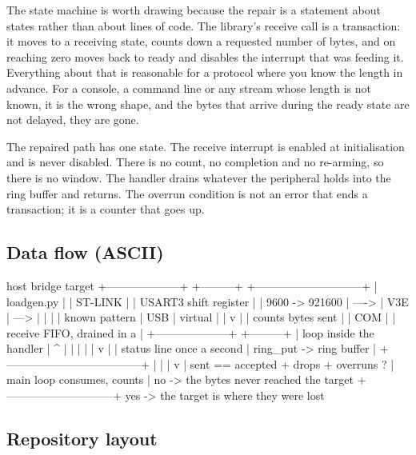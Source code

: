 The state machine is worth drawing because the repair is a statement about
states rather than about lines of code. The library's receive call is a
transaction: it moves to a receiving state, counts down a requested number of
bytes, and on reaching zero moves back to ready and disables the interrupt that
was feeding it. Everything about that is reasonable for a protocol where you
know the length in advance. For a console, a command line or any stream whose
length is not known, it is the wrong shape, and the bytes that arrive during the
ready state are not delayed, they are gone.

The repaired path has one state. The receive interrupt is enabled at
initialisation and is never disabled. There is no count, no completion and no
re-arming, so there is no window. The handler drains whatever the peripheral
holds into the ring buffer and returns. The overrun condition is not an error
that ends a transaction; it is a counter that goes up.

\subsection*{Data flow (ASCII)}

\begin{asciiart}
  host                          bridge                target
  +--------------------+       +---------+      +-----------------------------+
  | loadgen.py         |       | ST-LINK |      | USART3 shift register       |
  |  9600 -> 921600    | ----> | V3E     | ---> |   |                         |
  |  known pattern     |  USB  | virtual |      |   v                         |
  |  counts bytes sent |       | COM     |      | receive FIFO, drained in a  |
  +--------------------+       +---------+      | loop inside the handler     |
           ^                                    |   |                         |
           |                                    |   v                         |
           |   status line once a second        | ring_put -> ring buffer     |
           +------------------------------------+   |                         |
                                                |   v                         |
   sent == accepted + drops + overruns ?        | main loop consumes, counts  |
   no  -> the bytes never reached the target    +-----------------------------+
   yes -> the target is where they were lost
\end{asciiart}

\subsection*{Repository layout}

